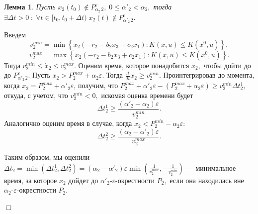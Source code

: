 \documentclass[11pt]{article}
\newtheorem{lemma}{Лемма}
\theoremstyle{definition}
\newenvironment{Proof}
{\par\noindent{\bf Доказательство.\\}} 
{\begin{flushright}$\Box$\end{flushright}}
\newcommand\Set[2]{\left\{ #1 \colon #2 \right\}}
\begin{document}

\begin{lemma}
\label{delta_t}
	Пусть $x_2(t_0) \not \in P_{\alpha_2 \,2}^{\varepsilon}, \; 0 \leqslant \alpha'_2 < \alpha_2,$ 
	тогда $\exists \Delta t > 0 \;:\; \forall t \in [t_0, t_0 + \Delta t) \; x_2(t) \not \in P_{\alpha'_2 \,2}^{\varepsilon}.$ 
\end{lemma}
\begin{Proof}
	Введем $$v_2^{min} = \min\Set{x_2(-r_2 - b_2x_3 + c_2x_1)}{K(x,u) \leqslant K(x^0,u)},$$
	$$v_2^{max} = \max\Set{x_2(-r_2 - b_2x_3 + c_2x_1)}{K(x,u) \leqslant K(x^0,u)}.$$ Тогда $v_2^{min} \leqslant \dot x_2 \leqslant v_2^{max}.$ Оценим время, которое понадобится $x_2,$ чтобы дойти до до $P_{\alpha'_2\,2}^{\varepsilon}$.
	Пусть $x_2 > P_2^{max} + \alpha_2\varepsilon.$ Тогда $\frac{d}{dt}x_2 \geqslant v_2^{min}.$ Проинтегрировав до момента, когда $x_2 = P_2^{max} + \alpha'_2\varepsilon$, получим, что $P_2^{max} + \alpha'_2\varepsilon - (P_2^{max} + \alpha_2\varepsilon) \geqslant v_2^{min}\Delta t^1_2,$ откуда, с учетом, что $v_2^{min} < 0,$ искомая оценка времени будет $$\Delta t^1_2 \geqslant \frac{(\alpha'_2 - \alpha_2)\varepsilon}{v_2^{min}}.$$
	Аналогично оценим время в случае, когда $x_2 < P_2^{min} - \alpha_2\varepsilon:$
	$$\Delta t^2_2 \geqslant \frac{(\alpha_2 - \alpha'_2)\varepsilon}{v_2^{max}}.$$

	Таким образом, мы оценили $\Delta t_2 = \min(\Delta t^1_2, \Delta t^2_2) = (\alpha_2 - \alpha'_2)\varepsilon\min(\frac{1}{v_2^{max}}, -\frac{1}{v_2^{min}})$ --- минимальное время, за которое $x_2$ дойдет до $\alpha'_2\text{-}\varepsilon$-окрестности $P_2,$ если она находилась вне $\alpha_2\text{-}\varepsilon$-окрестности $P_2.$
\end{Proof}
\end{document}
